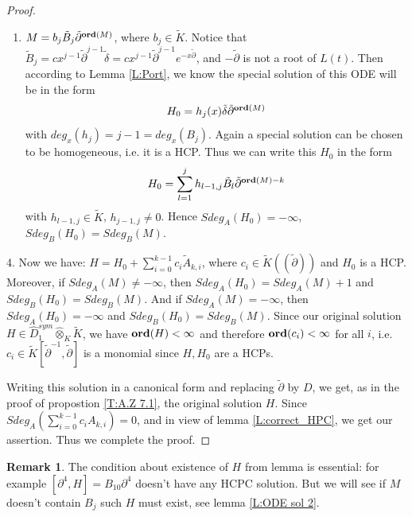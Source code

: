 \documentclass[11pt]{article}
\theoremstyle{definition}
\newcommand{\Ord}{\mathop {\rm \bf ord}}
\newtheorem{rem}{Remark}[section]
\theoremstyle{plain}
\numberwithin{equation}{section}
\begin{document}
\begin{proof}
\begin{enumerate}
 Now note that, since $M$ is homogeneous, a special solution can be chosen to be also homogeneous (just take the homogeneous component of any special solution), because the left hand side of our ODE is homogeneous for any homogeneous $H$. Then such a solution will be also an HCP and  
        	$$
        	Sdeg_A(H_0)=Sdeg_A(M)+1, \quad Sdeg_B(H_0)=Sdeg_B(M)=-\infty .
        	$$
        	\item $M=b_j\tilde{B}_j{ \tilde{\partial}^{\Ord(M)}}$, where $b_j\in \tilde{K}$. Notice that $\tilde{B}_j=cx^{j-1}\tilde{\partial}^{j-1}\tilde{\delta}= cx^{j-1}\tilde{\partial}^{j-1}e^{-x\tilde{\partial}}$, and $-\tilde{\partial}$ is not a root of $L(t)$. Then according to Lemma \ref{L:Port}, we know the special solution of this ODE will be in the form 
        	$$
        	H_0=h_j(x)\tilde{\delta}{\tilde{\partial}^{\Ord(M)}}
        	$$
        	with $deg_x(h_j)=j-1=deg_x(B_j)$. Again a special solution can be chosen to be homogeneous, i.e. it is a HCP. Thus we can write this $H_0$ in the form 
        	$$
        	H_0=\sum_{l=1}^{j}h_{l-1,j}\tilde{B}_l\tilde{\partial}^{\Ord (M)-k}
        	$$
        	with $h_{l-1,j}\in \tilde{K}$, $h_{j-1,j}\neq 0$. 
        	Hence $Sdeg_A(H_0)=-\infty$, $Sdeg_B(H_0)=Sdeg_B(M)$. 
       \end{enumerate}
        
        4. Now we have: $H=H_0+\sum_{i=0}^{k-1}c_i\tilde{A}_{k,i}$, where $c_i\in \tilde{K}((\tilde{\partial}))$ and $H_0$ is a HCP. Moreover, if  $Sdeg_A(M)\neq -\infty$, then $Sdeg_A(H_0)=Sdeg_A(M)+1$ and $Sdeg_B(H_0)=Sdeg_B(M)$. And if $Sdeg_A(M)= -\infty$, then $Sdeg_A(H_0)= -\infty$  and $Sdeg_B(H_0)=Sdeg_B(M)$. Since our original solution $H\in \hat{D}_1^{sym}\hat{\otimes}_K\tilde{K}$, we have $\Ord (H)<\infty$ and therefore $\Ord (c_i)< \infty$ for all $i$, i.e. $c_i\in \tilde{K} [\tilde{\partial}^{-1}, \tilde{\partial}]$ is a monomial since $H,H_0$ are a HCPs.  
        
Writing this solution in a canonical form and replacing $\tilde{\partial}$ by $D$, we get, as in the proof of propostion \ref{T:A.Z 7.1}, the original solution $H$. Since $Sdeg_A(\sum_{i=0}^{k-1}c_i{A}_{k,i})=0$, and in view of lemma \ref{L:correct_HPC}, we get our assertion. Thus we complete the proof.
	
\end{proof}

\begin{rem}
\label{R:ODE sol}
The condition about existence of $H$ from lemma is essential: for example $[\partial^4,H]=B_{10}\partial^4$ doesn't have any HCPC solution. But we will see if $M$ doesn't contain $B_j$ such $H$ must exist, see lemma \ref{L:ODE sol 2}.
\end{rem}
\end{document}

